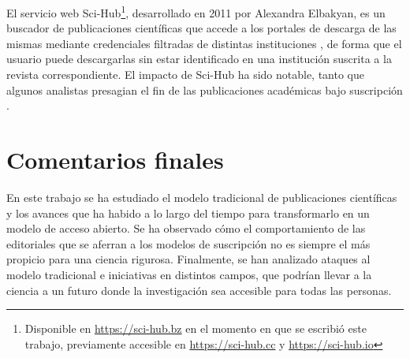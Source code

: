 El servicio web Sci-Hub\footnote{Disponible en \url{https://sci-hub.bz} en el momento en que se escribió este trabajo, previamente accesible en \url{https://sci-hub.cc} y \url{https://sci-hub.io}}, desarrollado en 2011 por Alexandra Elbakyan, es un buscador de publicaciones científicas que accede a los portales de descarga de las mismas mediante credenciales filtradas de distintas instituciones \cite{himmelstein-scihub}, de forma que el usuario puede descargarlas sin estar identificado en una institución suscrita a la revista correspondiente. El impacto de Sci-Hub ha sido notable, tanto que algunos analistas presagian el fin de las publicaciones académicas bajo suscripción \cite{sciencescihub}.



\section{Comentarios finales}

En este trabajo se ha estudiado el modelo tradicional de publicaciones científicas y los avances que ha habido a lo largo del tiempo para transformarlo en un modelo de acceso abierto. Se ha observado cómo el comportamiento de las editoriales que se aferran a los modelos de suscripción no es siempre el más propicio para una ciencia rigurosa. Finalmente, se han analizado ataques al modelo tradicional e iniciativas en distintos campos, que podrían llevar a la ciencia a un futuro donde la investigación sea accesible para todas las personas.
